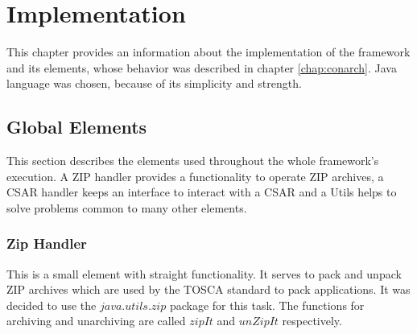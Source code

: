 
\chapter{Implementation}\label{chap:imp}
This chapter provides an information about the implementation of the framework and its elements, whose behavior was described in chapter \ref{chap:conarch}.
Java language was chosen, because of its simplicity and strength. 



\section{Global Elements}
This section describes the elements used throughout the whole framework's execution.
A ZIP handler provides a functionality to operate ZIP archives, a CSAR handler keeps an interface to interact with a CSAR and a Utils helps to solve problems common to many other elements.

\subsection*{Zip Handler}
This is a small element with straight functionality. 
It serves to pack and unpack ZIP archives which are used by the TOSCA standard to pack applications.
It was decided to use the $java$.$utils$.$zip$ package for this task.
The functions for archiving and unarchiving are called $zipIt$ and $unZipIt$ respectively. 

